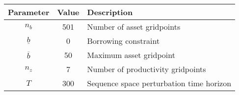\begin{tabular}{ccl}
    \toprule
    \textbf{Parameter} & \textbf{Value} & \textbf{Description} \\
    \midrule
    $n_b$ & 501 & Number of asset gridpoints \\
    $\underline{b}$ & 0 & Borrowing constraint \\
    $\overline{b}$ & 50 & Maximum asset gridpoint \\
    $n_z$ & 7 & Number of productivity gridpoints \\
    $T$ & 300 & Sequence space perturbation time horizon \\
    \bottomrule
\end{tabular}